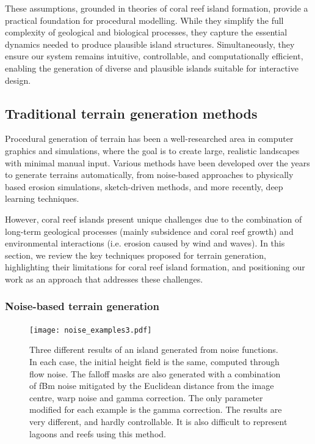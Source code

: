 These assumptions, grounded in theories of coral reef island formation, provide a practical foundation for procedural modelling. While they simplify the full complexity of geological and biological processes, they capture the essential dynamics needed to produce plausible island structures. Simultaneously, they ensure our system remains intuitive, controllable, and computationally efficient, enabling the generation of diverse and plausible islands suitable for interactive design.





\subsection{Traditional terrain generation methods}
\label{sec:coral-island-sota-traditional}

Procedural generation of terrain has been a well-researched area in computer graphics and simulations, where the goal is to create large, realistic landscapes with minimal manual input. Various methods have been developed over the years to generate terrains automatically, from noise-based approaches to physically based erosion simulations, sketch-driven methods, and more recently, deep learning techniques.

However, coral reef islands present unique challenges due to the combination of long-term geological processes (mainly subsidence and coral reef growth) and environmental interactions (i.e. erosion caused by wind and waves). In this section, we review the key techniques proposed for terrain generation, highlighting their limitations for coral reef island formation, and positioning our work as an approach that addresses these challenges.

\subsubsection{Noise-based terrain generation}

\begin{figure}
    \texttt{[image: noise\_examples3.pdf]}
    \caption{Three different results of an island generated from noise functions. In each case, the initial height field is the same, computed through flow noise. The falloff masks are also generated with a combination of fBm noise mitigated by the Euclidean distance from the image centre, warp noise and gamma correction. The only parameter modified for each example is the gamma correction. The results are very different, and hardly controllable. It is also difficult to represent lagoons and reefs using this method.}
    \label{fig:coral-island-noise-example}
\end{figure}

